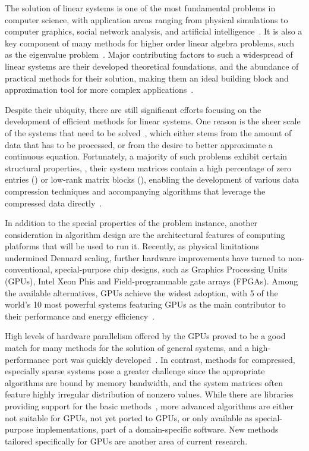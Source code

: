 The solution of linear systems is one of the most fundamental problems in
computer science, with application areas ranging from physical simulations to
computer graphics, social network analysis, and artificial
intelligence~\cite{saad,de-boor}. It is also a key component of many methods
for higher order linear algebra problems, such as the eigenvalue
problem~\cite{demmel,feast}. Major contributing factors to such a widespread of
linear systems are their developed theoretical foundations, and the
abundance of practical methods for their solution, making them an ideal building
block and approximation tool for more complex applications~\cite{demmel,higham}.

Despite their ubiquity, there are still significant efforts focusing on the
development of efficient methods for linear systems. One reason is the sheer
scale of the systems that need to be solved~\cite{exascale-report}, which either
stems from the amount of data that has to be processed, or from the desire to
better approximate a continuous equation. Fortunately, a majority of such
problems exhibit certain structural properties, \eg, their system matrices
contain a high percentage of zero entries () or
low-rank matrix blocks (), enabling the
development of various data compression techniques and accompanying algorithms
that leverage the compressed data
directly~\cite{saad,duff,barrettemplates,hierarchical}.

In addition to the special properties of the problem instance, another
consideration in algorithm design are the architectural features of computing
platforms that will be used to run it. Recently, as physical limitations
undermined Dennard scaling, further hardware improvements have turned to
non-conventional, special-purpose chip designs, such as Graphics Processing
Units (GPUs), Intel Xeon Phis and Field-programmable gate arrays (FPGAs). Among
the available alternatives, GPUs achieve the widest adoption, with 5 of the
world's 10 most powerful systems featuring GPUs as the main contributor to their
performance and energy efficiency~\cite{top500}.

High levels of hardware parallelism offered by the GPUs proved to be a good
match for many methods for the solution of general systems, and a
high-performance port was quickly developed~\cite{magma}. In contrast,
methods for compressed, especially sparse systems pose a greater challenge since
the appropriate algorithms are bound by memory bandwidth, and the system
matrices often feature highly irregular distribution of nonzero values. While
there are libraries providing support for the basic
methods~\cite{magma,vienna-cl,paralution,ginkgo}, more advanced algorithms are
either not suitable for GPUs, not yet ported to GPUs, or only available as
special-purpose implementations, part of a domain-specific software. New methods
tailored specifically for GPUs are another area of current research.


